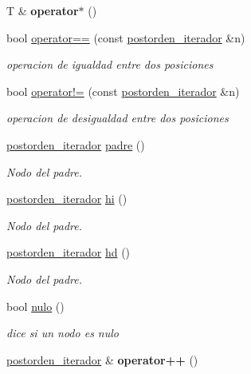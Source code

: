 \begin{DoxyCompactItemize}
\mbox{\label{classArbolBinario_1_1postorden__iterador_a01f615fcbadf49398d21a0e32536fb7d}} 
T \& {\bfseries operator$\ast$} ()
\item 
bool \hyperlink{classArbolBinario_1_1postorden__iterador_a4cdc13f9e5ab8479f777d6a18a984cf4}{operator==} (const \hyperlink{classArbolBinario_1_1postorden__iterador}{postorden\+\_\+iterador} \&n)
\begin{DoxyCompactList}\small\item\em operacion de igualdad entre dos posiciones \end{DoxyCompactList}\item 
bool \hyperlink{classArbolBinario_1_1postorden__iterador_a0a322877b7d8b222e69ad3c503c939a8}{operator!=} (const \hyperlink{classArbolBinario_1_1postorden__iterador}{postorden\+\_\+iterador} \&n)
\begin{DoxyCompactList}\small\item\em operacion de desigualdad entre dos posiciones \end{DoxyCompactList}\item 
\hyperlink{classArbolBinario_1_1postorden__iterador}{postorden\+\_\+iterador} \hyperlink{classArbolBinario_1_1postorden__iterador_a7893b03a1cf0ab8b58ecf3bdb24dcc4c}{padre} ()
\begin{DoxyCompactList}\small\item\em Nodo del padre. \end{DoxyCompactList}\item 
\hyperlink{classArbolBinario_1_1postorden__iterador}{postorden\+\_\+iterador} \hyperlink{classArbolBinario_1_1postorden__iterador_a48a46e7e33e0d385edb9e66b92bac042}{hi} ()
\begin{DoxyCompactList}\small\item\em Nodo del padre. \end{DoxyCompactList}\item 
\hyperlink{classArbolBinario_1_1postorden__iterador}{postorden\+\_\+iterador} \hyperlink{classArbolBinario_1_1postorden__iterador_a8c22fe0d4114f7e6be801e711a4b21e8}{hd} ()
\begin{DoxyCompactList}\small\item\em Nodo del padre. \end{DoxyCompactList}\item 
bool \hyperlink{classArbolBinario_1_1postorden__iterador_a27af730213949c932dc3d3b69ac8d756}{nulo} ()
\begin{DoxyCompactList}\small\item\em dice si un nodo es nulo \end{DoxyCompactList}\item 
\mbox{\label{classArbolBinario_1_1postorden__iterador_a9aa25bdcb42240096d3a40e9342eca49}} 
\hyperlink{classArbolBinario_1_1postorden__iterador}{postorden\+\_\+iterador} \& {\bfseries operator++} ()
\end{DoxyCompactItemize}

